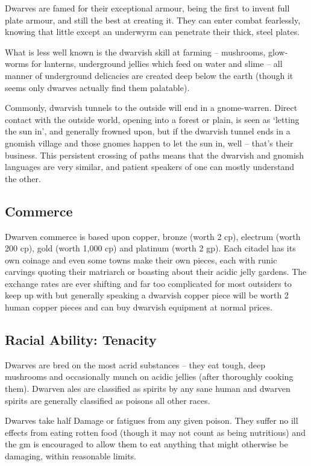 \begin{multicols}{2}
Dwarves are famed for their exceptional armour, being the first to invent full plate armour, and still the best at creating it. They can enter combat fearlessly, knowing that little except an underwyrm can penetrate their thick, steel plates.

What is less well known is the dwarvish skill at farming -- mushrooms, glow-worms for lanterns, underground jellies which feed on water and slime -- all manner of underground delicacies are created deep below the earth (though it seems only dwarves actually find them palatable).

Commonly, dwarvish tunnels to the outside will end in a gnome-warren. Direct contact with the outside world, opening into a forest or plain, is seen as `letting the sun in', and generally frowned upon, but if the dwarvish tunnel ends in a gnomish village and those gnomes happen to let the sun in, well -- that's their business.
This persistent crossing of paths means that the dwarvish and gnomish languages are very similar, and patient speakers of one can mostly understand the other.

\subsection{Commerce}

Dwarven commerce is based upon copper, bronze (worth 2 cp), electrum (worth 200 cp), gold (worth 1,000 cp) and platinum (worth 2 gp).
Each citadel has its own coinage and even some towns make their own pieces, each with runic carvings quoting their matriarch or boasting about their acidic jelly gardens.
The exchange rates are ever shifting and far too complicated for most outsiders to keep up with but generally speaking a dwarvish copper piece will be worth 2 human copper pieces and can buy dwarvish equipment at normal prices.

\subsection{Racial Ability: Tenacity}

Dwarves are bred on the most acrid substances -- they eat tough, deep mushrooms and occasionally munch on acidic jellies (after thoroughly cooking them).
Dwarven ales are classified as spirits by any sane human and dwarven spirits are generally classified as poisons all other races.

Dwarves take half Damage or \glspl{fatigue} from any given poison.
They suffer no ill effects from eating rotten food (though it may not count as being nutritious) and the \gls{gm} is encouraged to allow them to eat anything that might otherwise be damaging, within reasonable limits.


\end{multicols}
